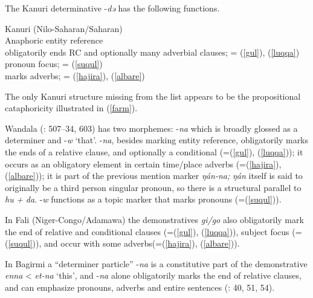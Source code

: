 \documentclass[output=paper]{langsci/langscibook}
\begin{document}
The Kanuri determinative -\textit{də} has the following functions.

\ea\label{kanuri} 
{}{}{Kanuri (Nilo-Saharan/Saharan)}\\

{}{}{Anaphoric entity reference}\\
  \ea\label{ex:nigeria:}
{}{}{obligatorily ends RC and optionally many adverbial clauses}; = (\ref{gul}), (\ref{luqqa})\\
\ex\label{ex:nigeria:}
{}{}{pronoun focus}; = (\ref{suqul})\\
\ex\label{ex:nigeria:}
{}{}{marks adverbs}; = (\ref{hajira}), (\ref{albare})\\
\z
\z

The only Kanuri structure missing from the list appears to be the propositional cataphoricity illustrated in (\ref{farm}).

Wandala (\citealt{Frajzyngier2012}: 507–34, 603) has two morphemes: -\textit{na} which is broadly glossed as a determiner and -\textit{w} ‘that’. -\textit{na}, besides marking entity reference, obligatorily marks the ends of a relative clause, and optionally a conditional (=(\ref{gul}), (\ref{luqqa})); it occurs as an obligatory element in certain time/place adverbs (=(\ref{hajira}), (\ref{albare})); it is part of the previous mention marker \textit{ŋán-na;} \textit{ŋán} itself is said to originally be a third person singular pronoun, so there is a structural parallel to \textit{hu} \textit{+} \textit{da}. -\textit{w} functions as a topic marker that marks pronouns (=(\ref{suqul})).

In Fali (Niger-Congo/Adamawa) the demonstratives \textit{gi/go} also obligatorily mark the end of relative and conditional clauses (=(\ref{gul}), (\ref{luqqa})), subject focus (=(\ref{suqul})), and occur with some adverbs(=(\ref{hajira}), (\ref{albare})).

In Bagirmi a “determiner particle” -\textit{na} is a constitutive part of the demonstrative \textit{enna} < \textit{et-na} ‘this’, and -\textit{na} alone obligatorily marks the end of relative clauses, and can emphasize pronouns, adverbs and entire sentences (\citealt{Stevenson1969}: 40, 51, 54). 
\end{document}

